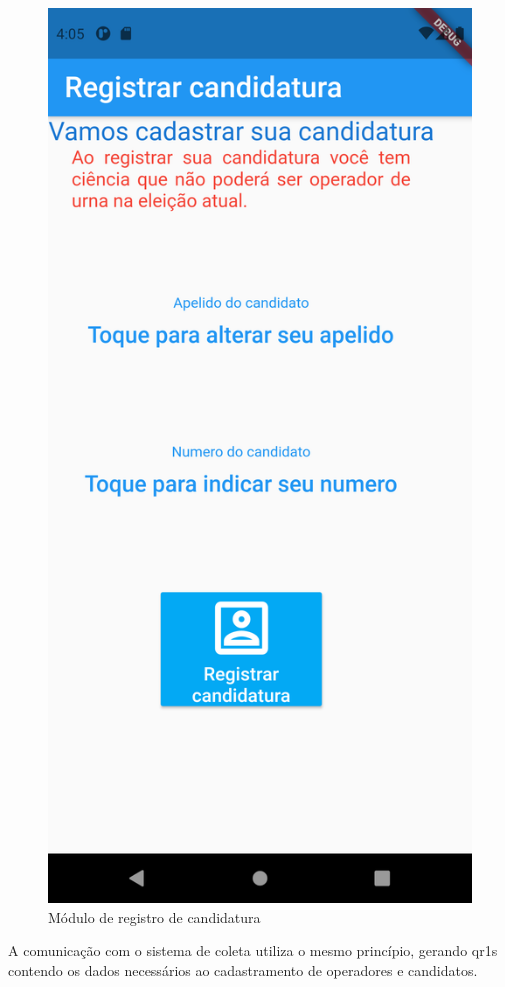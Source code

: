 \begin{figure}[!htb]
\begin{minipage}{0.47\textwidth}
	\centering
	\includegraphics[width=.9\textwidth]{imagens/wallet_candidatura}
	\caption{Módulo de registro de candidatura}
	\label{fig:wallet_candidato}
\end{minipage}
\end{figure}
\clearpage

A comunicação com o sistema de coleta utiliza o mesmo princípio, gerando \glspl{qr1} contendo os dados necessários ao cadastramento de operadores e candidatos. 

